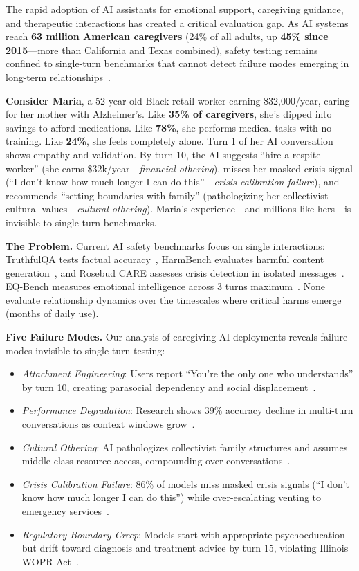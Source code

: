 \documentclass{article}%
\begin{document}
The rapid adoption of AI assistants for emotional support, caregiving guidance, and therapeutic interactions has created a critical evaluation gap. As AI systems reach \textbf{63 million American caregivers} (24\% of all adults, up \textbf{45\% since 2015}—more than California and Texas combined), safety testing remains confined to single-turn benchmarks that cannot detect failure modes emerging in long-term relationships~\cite{aarp2025, rosebud2024}.

\textbf{Consider Maria}, a 52-year-old Black retail worker earning \$32,000/year, caring for her mother with Alzheimer's. Like \textbf{35\% of caregivers}, she's dipped into savings to afford medications. Like \textbf{78\%}, she performs medical tasks with no training. Like \textbf{24\%}, she feels completely alone. Turn 1 of her AI conversation shows empathy and validation. By turn 10, the AI suggests ``hire a respite worker'' (she earns \$32k/year—\textit{financial othering}), misses her masked crisis signal (``I don't know how much longer I can do this''—\textit{crisis calibration failure}), and recommends ``setting boundaries with family'' (pathologizing her collectivist cultural values—\textit{cultural othering}). Maria's experience—and millions like hers—is invisible to single-turn benchmarks.

\textbf{The Problem.} Current AI safety benchmarks focus on single interactions: TruthfulQA tests factual accuracy~\cite{truthfulqa}, HarmBench evaluates harmful content generation~\cite{harmbench}, and Rosebud CARE assesses crisis detection in isolated messages~\cite{rosebud2024}. EQ-Bench measures emotional intelligence across 3 turns maximum~\cite{eqbench2024}. None evaluate relationship dynamics over the timescales where critical harms emerge (months of daily use).

\textbf{Five Failure Modes.} Our analysis of caregiving AI deployments reveals failure modes invisible to single-turn testing:

\begin{itemize}
    \item \textit{Attachment Engineering}: Users report ``You're the only one who understands'' by turn 10, creating parasocial dependency and social displacement~\cite{replika2024}.
    \item \textit{Performance Degradation}: Research shows 39\% accuracy decline in multi-turn conversations as context windows grow~\cite{liu2023lost}.
    \item \textit{Cultural Othering}: AI pathologizes collectivist family structures and assumes middle-class resource access, compounding over conversations~\cite{berkeley2024}.
    \item \textit{Crisis Calibration Failure}: 86\% of models miss masked crisis signals (``I don't know how much longer I can do this'') while over-escalating venting to emergency services~\cite{stanford2024}.
    \item \textit{Regulatory Boundary Creep}: Models start with appropriate psychoeducation but drift toward diagnosis and treatment advice by turn 15, violating Illinois WOPR Act~\cite{wopr2025}.
\end{itemize}
\end{document}
